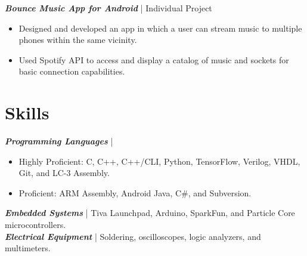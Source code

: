 \documentclass[letter]{res}
\begin{document}
\begin{resume}
\vspace{-2mm}

{\sl \textbf{Bounce Music App for Android}} | Individual Project\\

 \vspace{-4mm}
 
\begin{itemize}
 \item Designed and developed an app in which a user can stream music to multiple phones within the same vicinity.
 \item Used Spotify API to access and display a catalog of music and sockets for basic connection capabilities.
\end{itemize}

\vspace{-2mm}
 
\section{Skills}
{\sl \textbf{Programming Languages}} | 
\begin{itemize}
 \item Highly Proficient: C, C++, C++/CLI, Python, TensorFlow, Verilog, VHDL, Git, and LC-3 Assembly.
 \item Proficient: ARM Assembly, Android Java, C\#, and Subversion.
\end{itemize}
 \vspace{-4mm}
{\sl \textbf{Embedded Systems}} | Tiva Launchpad, Arduino, SparkFun, and Particle Core microcontrollers.\\
{\sl \textbf{Electrical Equipment}} | Soldering, oscilloscopes, logic analyzers, and multimeters.\\

\vspace{-6mm}


\end{resume}
\end{document}
